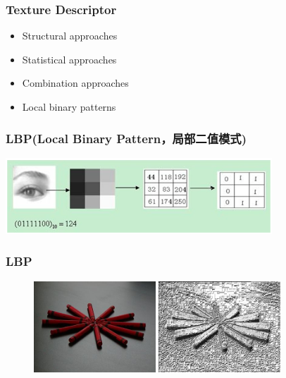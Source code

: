 \documentclass[notheorems,serif,table,compress]{beamer}  %
\begin{document}
\begin{frame}
\frametitle{Texture Descriptor}
\begin{itemize}
\item Structural approaches
\item Statistical approaches
\item Combination approaches
\item Local binary patterns
\end{itemize}
\end{frame}


\begin{frame}
\frametitle{LBP(Local Binary Pattern，局部二值模式)}
\centering\includegraphics[width=10cm]{LBP.png}
\end{frame}


\begin{frame}
\frametitle{LBP}
  \begin{figure}[!ht]
  \begin{minipage}[t]{0.46\textwidth}
  \includegraphics[width=1.8in]{example1.jpg}
  \end{minipage}
  \begin{minipage}[t]{0.46\textwidth}
  \includegraphics[width=1.8in]{LBP1.png}
  \end{minipage}
  \end{figure} 
\end{frame}
\end{document}
